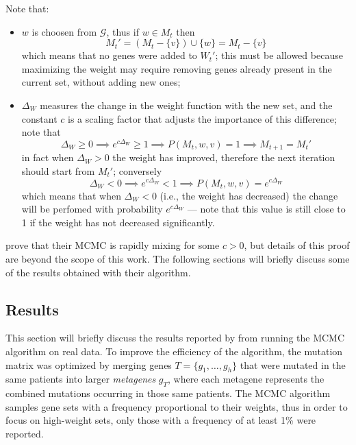 Note that:

\begin{itemize}
    \item $w$ is choosen from $\mathcal G$, thus if $w \in M_t$ then $$M_t' = (M_t - \{v\}) \cup \{w\} = M_t - \{v\}$$ which means that no genes were added to $W_t'$; this must be allowed because maximizing the weight may require removing genes already present in the current set, without adding new ones;
    \item $\Delta_W$ measures the change in the weight function with the new set, and the constant $c$ is a scaling factor that adjusts the importance of this difference; note that $$\Delta_W \ge 0 \implies e^{c \Delta_W} \ge 1 \implies P(M_t, w, v) = 1 \implies M_{t + 1} = M_t'$$ in fact when $\Delta_W > 0$ the weight has improved, therefore the next iteration should start from $M_t'$; conversely $$\Delta_W < 0 \implies e^{c \Delta_W} < 1 \implies P(M_t, w, v) = e ^{c \Delta_W}$$ which means that when $\Delta_W < 0$ (i.e., the weight has decreased) the change will be perfomed with probability $e^{c \Delta_W}$ --- note that this value is still close to 1 if the weight has not decreased significantly.
\end{itemize}

\textcite{dendrix} prove that their MCMC is rapidly mixing for some $c > 0$, but details of this proof are beyond the scope of this work. The following sections will briefly discuss some of the results obtained with their algorithm.

\subsection{Results} \label{results_dendrix}

This section will briefly discuss the results reported by \textcite{dendrix} from running the MCMC algorithm on real data. To improve the efficiency of the algorithm, the mutation matrix was optimized by merging genes $T = \{g_1, \ldots, g_h\}$ that were mutated in the same patients into larger \textit{metagenes} $g_T$, where each metagene represents the combined mutations occurring in those same patients. The MCMC algorithm samples gene sets with a frequency proportional to their weights, thus in order to focus on high-weight sets, only those with a frequency of at least 1\% were reported.

